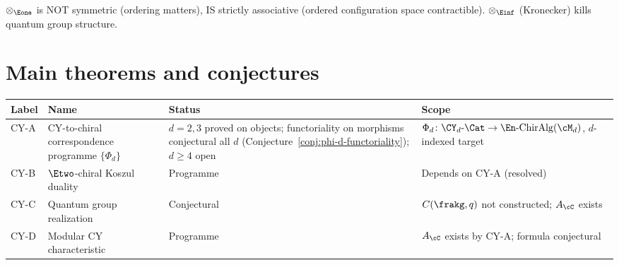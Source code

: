 \noindent
$\otimes_{\Eone}$ is NOT symmetric (ordering matters), IS strictly associative
(ordered configuration space contractible).  $\otimes_{\Einf}$ (Kronecker)
kills quantum group structure.

\section{Main theorems and conjectures}
\label{sec:notation-theorems}

\begin{center}
\begin{tabular}{@{}llll@{}}
\toprule
\textbf{Label} & \textbf{Name} & \textbf{Status} & \textbf{Scope} \\
\midrule
CY-A & CY-to-chiral correspondence programme $\{\Phi_d\}$ & $d=2,3$ proved on objects; functoriality on morphisms conjectural all $d$ (Conjecture~\ref{conj:phi-d-functoriality}); $d \geq 4$ open & $\Phi_d\colon \CY_d\text{-}\Cat \to \En\text{-}\mathrm{ChirAlg}(\cM_d)$, $d$-indexed target \\
CY-B & $\Etwo$-chiral Koszul duality & Programme & Depends on CY-A (resolved) \\
CY-C & Quantum group realization & Conjectural & $C(\frakg,q)$ not constructed; $A_\cC$ exists \\
CY-D & Modular CY characteristic & Programme & $A_\cC$ exists by CY-A; formula conjectural \\
\bottomrule
\end{tabular}
\end{center}
